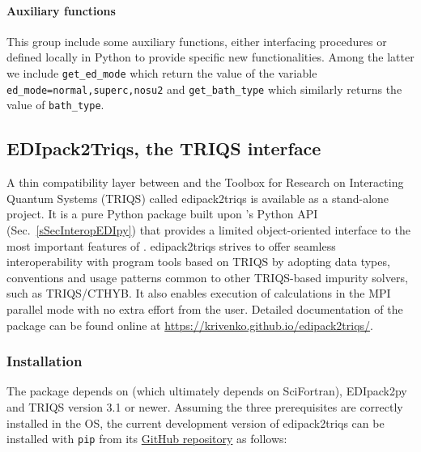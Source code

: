 \documentclass[edipack2.tex]{subfiles}
\begin{document}
\paragraph{{\bf Auxiliary functions}}
This group include some auxiliary functions, either interfacing \NAME
procedures or defined locally in Python to provide specific new
functionalities. Among the latter we include {\tt get\_ed\_mode} which
return the value of the variable {\tt ed\_mode=normal,superc,nosu2}
and {\tt get\_bath\_type} which similarly returns the value of {\tt bath\_type}.









\subsection{EDIpack2Triqs, the TRIQS interface}\label{sSecInteropTRIQS}
A thin compatibility layer between \NAME and the Toolbox for Research on
Interacting Quantum Systems (TRIQS)\cite{Parcollet2015CPC} called edipack2triqs
is available as a stand-alone project. It is a pure Python package
built upon \NAME's Python API  (Sec.~\ref{sSecInteropEDIpy}) that provides a
limited object-oriented interface to the most important features of \NAME.
edipack2triqs strives to offer seamless interoperability with program tools
based on TRIQS by adopting data types, conventions and usage patterns
common to other TRIQS-based impurity solvers, such as
TRIQS/CTHYB\cite{Seth2016CPC}. It also enables execution of \NAME calculations
in the MPI parallel mode with no extra effort from the user.
Detailed documentation of the package can be 
found online at \href{https://krivenko.github.io/edipack2triqs/}
{https://krivenko.github.io/edipack2triqs/}.

\subsubsection{Installation}\label{sSecInteropTRIQSInstallation}
The package depends on \NAME (which ultimately depends on SciFortran), EDIpack2py
and TRIQS version 3.1 or newer. Assuming the three prerequisites are correctly 
installed in the OS, the current development version of edipack2triqs can be 
installed with {\tt pip} from its 
\href{https://github.com/krivenko/edipack2triqs}{GitHub repository} as follows:
\end{document}
